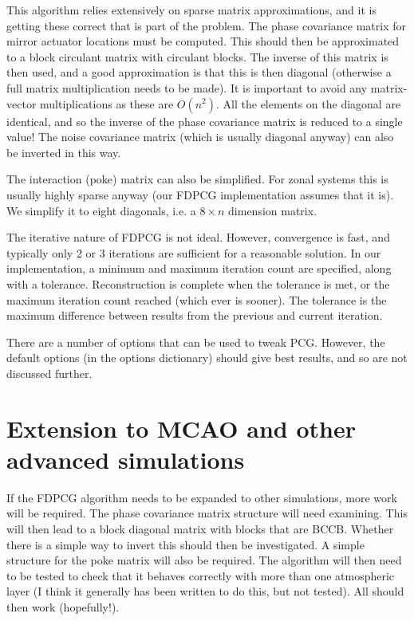 \documentclass{article}
\begin{document}
This algorithm relies extensively on sparse matrix approximations, and
it is getting these correct that is part of the problem.  The phase
covariance matrix for mirror actuator locations must be computed.
This should then be approximated to a block circulant matrix with
circulant blocks.  The inverse of this matrix is then used, and a good
approximation is that this is then diagonal (otherwise a full matrix
multiplication needs to be made).  It is important to avoid any matrix-vector
multiplications as these are $O(n^2)$.  All the elements on the
diagonal are identical, and so the inverse of the phase covariance
matrix is reduced to a single value!  The noise covariance matrix
(which is usually diagonal anyway) can also be inverted in this way.

The interaction (poke) matrix can also be simplified.  For zonal
systems this is usually highly sparse anyway (our FDPCG implementation
assumes that it is).  We simplify it to eight diagonals, i.e. a
$8\times n$ dimension matrix.

The iterative nature of FDPCG is not ideal.  However, convergence is
fast, and typically only 2 or 3 iterations are sufficient for a
reasonable solution.  In our implementation, a minimum and maximum
iteration count are specified, along with a tolerance.  Reconstruction
is complete when the tolerance is met, or the maximum iteration count
reached (which ever is sooner).  The tolerance is the maximum
difference between results from the previous and current iteration.  

There are a number of options that can be used to tweak PCG.  However,
the default options (in the options dictionary) should give best
results, and so are not discussed further.  

\section{Extension to MCAO and other advanced simulations}
If the FDPCG algorithm needs to be expanded to other simulations, more
work will be required.  The phase covariance matrix structure will
need examining.  This will then lead to a block diagonal matrix with
blocks that are BCCB.  Whether there is a simple way to invert this
should then be investigated.  A simple structure for the poke matrix
will also be required.  The algorithm will then need to be tested to
check that it behaves correctly with more than one atmospheric layer
(I think it generally has been written to do this, but not tested).
All should then work (hopefully!).



\printindex
\end{document}
